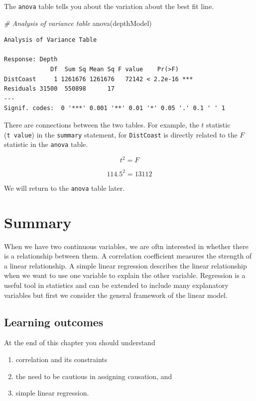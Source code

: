\documentclass[
  oneside]{krantz}
\newenvironment{Shaded}{\begin{snugshade}}{\end{snugshade}}
\newcommand{\CommentTok}[1]{\textcolor[rgb]{0.56,0.35,0.01}{\textit{#1}}}
\newcommand{\FunctionTok}[1]{\textcolor[rgb]{0.00,0.00,0.00}{#1}}
\newcommand{\NormalTok}[1]{#1}
\providecommand{\tightlist}{%
  \setlength{\itemsep}{0pt}\setlength{\parskip}{0pt}}
\begin{document}
The \texttt{anova} table tells you about the variation about the best fit line.

\begin{Shaded}
\begin{Highlighting}[]
\CommentTok{\# Analysis of variance table}
\FunctionTok{anova}\NormalTok{(depthModel)}
\end{Highlighting}
\end{Shaded}

\begin{verbatim}
Analysis of Variance Table

Response: Depth
             Df  Sum Sq Mean Sq F value    Pr(>F)    
DistCoast     1 1261676 1261676   72142 < 2.2e-16 ***
Residuals 31500  550898      17                      
---
Signif. codes:  0 '***' 0.001 '**' 0.01 '*' 0.05 '.' 0.1 ' ' 1
\end{verbatim}

There are connections between the two tables. For example, the \(t\) statistic (\texttt{t\ value}) in the \texttt{summary} statement, for \texttt{DistCoast} is directly related to the \(F\) statistic in the \texttt{anova} table.

\[t^2 = F\]

\[114.5^2 = 13112\]

We will return to the \texttt{anova} table later.

\hypertarget{SUMcorreg}{%
\section{Summary}\label{SUMcorreg}}

When we have two continuous variables, we are oftn interested in whether there is a relationship between them. A correlation coefficient measures the strength of a linear relationship. A simple linear regression describes the linear relationship when we want to use one variable to explain the other variable. Regression is a useful tool in statistics and can be extended to include many explanatory variables but first we consider the general framework of the linear model.

\hypertarget{learning-outcomes-9}{%
\subsection{Learning outcomes}\label{learning-outcomes-9}}

At the end of this chapter you should understand

\begin{enumerate}
\def\labelenumi{\arabic{enumi}.}
\tightlist
\item
  correlation and its constraints
\item
  the need to be cautious in assigning causation, and
\item
  simple linear regression.
\end{enumerate}
\end{document}
